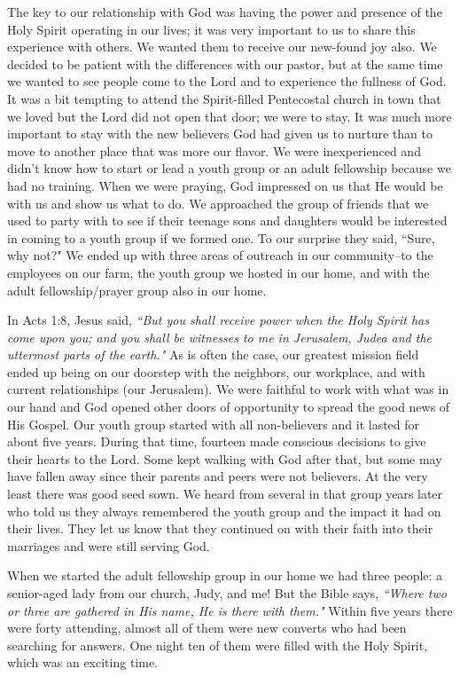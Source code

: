 \documentclass[oneside]{book}
\begin{document}
The key to our relationship with God was having the power and presence of the Holy Spirit operating in our lives; it was very important to us to share this experience with others. We wanted them to receive our new-found joy also. We decided to be patient with the differences with our pastor, but at the same time we wanted to see people come to the Lord and to experience the fullness of God. It was a bit tempting to attend the Spirit-filled Pentecostal church in town that we loved but the Lord did not open that door; we were to stay. It was much more important to stay with the new believers God had given us to nurture than to move to another place that was more our flavor. We were inexperienced and didn't know how to start or lead a youth group or an adult fellowship because we had no training. When we were praying, God impressed on us that He would be with us and show us what to do. We approached the group of friends that we used to party with to see if their teenage sons and daughters would be interested in coming to a youth group if we formed one. To our surprise they said, ``Sure, why not?" We ended up with three areas of outreach in our community--to the employees on our farm, the youth group we hosted in our home, and with the adult fellowship/prayer group also in our home.

In Acts 1:8, Jesus said, \textit{``But you shall receive power when the Holy Spirit has come upon you; and you shall be witnesses to me in Jerusalem, Judea and the uttermost parts of the earth."} As is often the case, our greatest mission field ended up being on our doorstep with the neighbors, our workplace, and with current relationships (our Jerusalem). We were faithful to work with what was in our hand and God opened other doors of opportunity to spread the good news of His Gospel. Our youth group started with all non-believers and it lasted for about five years. During that time, fourteen made conscious decisions to give their hearts to the Lord. Some kept walking with God after that, but some may have fallen away since their parents and peers were not believers. At the very least there was good seed sown. We heard from several in that group years later who told us they always remembered the youth group and the impact it had on their lives. They let us know that they continued on with their faith into their marriages and were still serving God.

When we started the adult fellowship group in our home we had three people: a senior-aged lady from our church, Judy, and me! But the Bible says, \textit{``Where two or three are gathered in His name, He is there with them."} Within five years there were forty attending, almost all of them were new converts who had been searching for answers. One night ten of them were filled with the Holy Spirit, which was an exciting time. 
\end{document}
